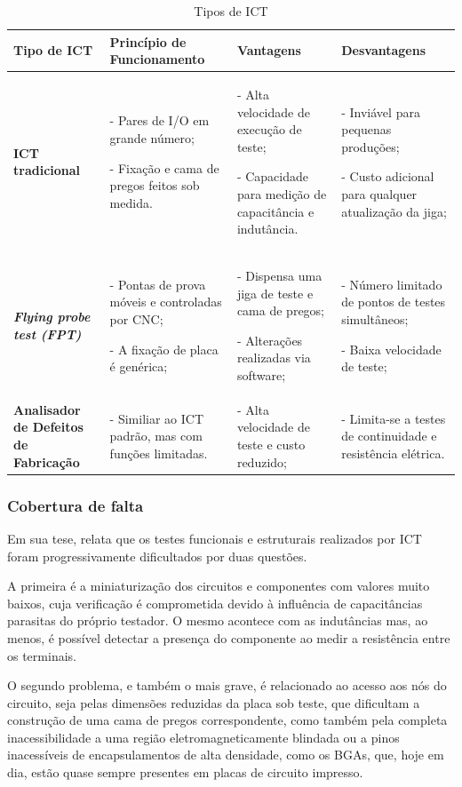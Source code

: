 \begin{table}[h!]
\centering
\caption{Tipos de ICT}
\label{table:tiposdeict}
{\footnotesize 
\begin{tabularx}{\textwidth}{@{} Y Y Y Y @{}}
\toprule
  \textbf{Tipo de ICT} & \textbf{Princípio de \mbox{Funcionamento}}  &\textbf{Vantagens}  &\textbf{Desvantagens} & \\ \midrule
\textbf{ICT tradicional} & - Pares de I/O em grande número; 

- Fixação e cama de pregos feitos sob medida. & - Alta velocidade de execução de teste; 

- Capacidade para medição de capacitância e indutância. & - Inviável para pequenas produções;

- Custo adicional para qualquer atualização da jiga;  \\ \addlinespace
\textit{\textbf{Flying probe test (FPT)}} & - Pontas de prova móveis e controladas por CNC; 

- A fixação de placa é genérica;
 & - Dispensa uma jiga de teste e cama de pregos; 
 
 - Alterações realizadas via software;
 & 
- Número limitado de pontos de testes simultâneos; 

- Baixa velocidade de teste; & \\ \addlinespace
\textbf{Analisador de Defeitos de Fabricação}
 & - Similiar ao ICT padrão, mas com funções limitadas.
 & - Alta velocidade de teste e custo reduzido;
 & - Limita-se a testes de continuidade e resistência elétrica.
  & \\ \bottomrule
\end{tabularx}}
\end{table}

\subsubsection{Cobertura de falta}
Em sua tese, \citet{de2008apoio} relata que os testes funcionais e estruturais realizados por ICT foram progressivamente dificultados por duas questões. 

A primeira é a miniaturização dos circuitos e componentes com valores muito baixos, cuja verificação é comprometida  devido à influência de capacitâncias parasitas do próprio testador. O mesmo acontece com as indutâncias mas, ao menos, é possível detectar a presença do componente ao medir a resistência entre os terminais.

O segundo problema, e também o mais grave, é relacionado ao acesso aos nós do circuito, seja pelas dimensões reduzidas da placa sob teste, que dificultam a construção de uma cama de pregos correspondente, como também pela completa inacessibilidade a uma região eletromagneticamente blindada ou a pinos inacessíveis de encapsulamentos de alta densidade, como os BGAs, que, hoje em dia, estão quase sempre presentes em placas de circuito impresso.

